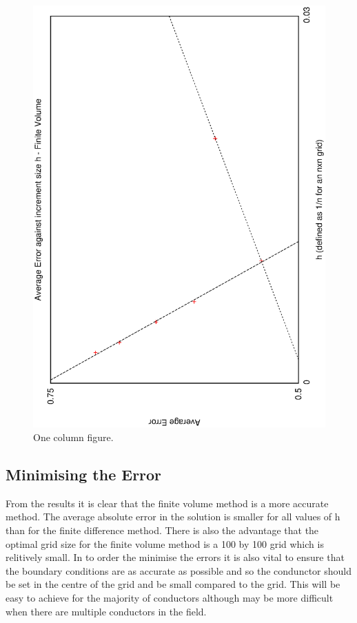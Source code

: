 \documentclass[aps,twocolumn,pre,nofootinbib]{revtex4}
\begin{document}
\begin{figure}
\includegraphics[height=\breite \columnwidth,angle=-90]{fv_conv.eps}

\caption{One column figure.}
\label{fig:fv_opt}
\end{figure}

\subsection{Minimising the Error}

From the results it is clear that the finite volume method is a more accurate method. The average absolute error in the solution is smaller for all values of h than for the finite difference method. There is also the advantage that the optimal grid size for the finite volume method is a 100 by 100 grid which is relitively small.
In to order the minimise the errors it is also vital to ensure that the boundary conditions are as accurate as possible and so the condunctor should be set in the centre of the grid and be small compared to the grid. This will be easy to achieve for the majority of conductors although may be more difficult when there are multiple conductors in the field.
\end{document}
